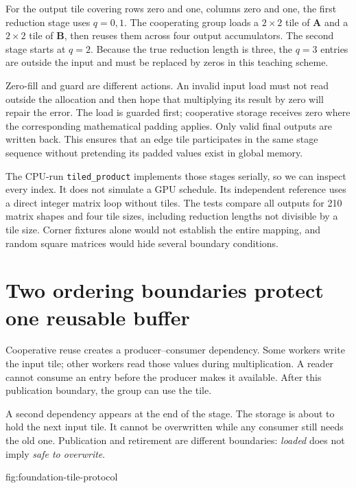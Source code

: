 For the output tile covering rows zero and one, columns
zero and one, the first reduction stage uses $q=0,1$.
The cooperating group loads a $2\times2$ tile of
$\mathbf{A}$ and a $2\times2$ tile of $\mathbf{B}$,
then reuses them across four output accumulators. The
second stage starts at $q=2$. Because the true reduction
length is three, the $q=3$ entries are outside the input
and must be replaced by zeros in this teaching scheme.

Zero-fill and guard are different actions. An invalid input
load must not read outside the allocation and then hope
that multiplying its result by zero will repair the error.
The load is guarded first; cooperative storage receives
zero where the corresponding mathematical padding applies.
Only valid final outputs are written back. This ensures
that an edge tile participates in the same stage sequence
without pretending its padded values exist in global memory.

The CPU-run \texttt{tiled\_product} implements those stages
serially, so we can inspect every index. It does not
simulate a GPU schedule. Its independent reference uses
a direct integer matrix loop without tiles. The tests
compare all outputs for 210 matrix shapes and four tile
sizes, including reduction lengths not divisible by a
tile size. Corner fixtures alone would not establish
the entire mapping, and random square matrices would
hide several boundary conditions.

\section{Two ordering boundaries protect one reusable buffer}
Cooperative reuse creates a producer--consumer dependency.
Some workers write the input tile; other workers read those
values during multiplication. A reader cannot consume an
entry before the producer makes it available. After this
publication boundary, the group can use the tile.

A second dependency appears at the end of the stage. The
storage is about to hold the next input tile. It cannot
be overwritten while any consumer still needs the old one.
Publication and retirement are different boundaries:
\textit{loaded} does not imply \textit{safe to overwrite}.

{fig:foundation-tile-protocol}

